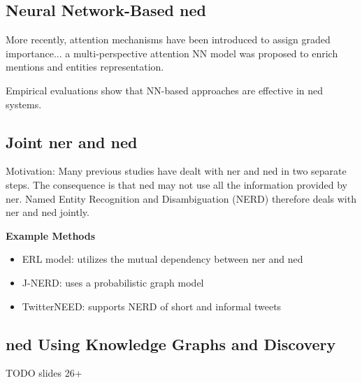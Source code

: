 \subsection*{Neural Network-Based \gls{ned}}

More recently, attention mechanisms have been introduced to assign graded
importance... a multi-perspective attention NN model was proposed to enrich mentions
and entities representation.

Empirical evaluations show that NN-based approaches are effective in \gls{ned} systems.

\subsection*{Joint \gls{ner} and \gls{ned}}
Motivation: Many previous studies have dealt with \gls{ner} and \gls{ned} in two separate steps. The
consequence is that \gls{ned} may not use all the information provided by \gls{ner}. Named
Entity Recognition and Disambiguation (NERD) therefore deals with \gls{ner} and \gls{ned}
jointly.

\begin{bsp}
    \textbf{Example Methods}
    \begin{itemize}
        \item ERL model: utilizes the mutual dependency between \gls{ner} and \gls{ned}
        \item J-NERD: uses a probabilistic graph model
        \item TwitterNEED: supports NERD of short and informal tweets
    \end{itemize}
\end{bsp}

\subsection*{\gls{ned} Using Knowledge Graphs and Discovery}


TODO slides 26+
